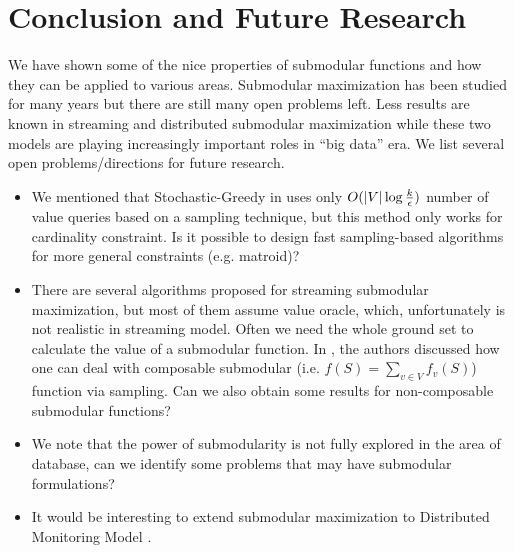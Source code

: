 \section{Conclusion and Future Research}
\label{sec:conclusion}
We have shown some of the nice properties of submodular functions and how they can be applied to various areas. Submodular maximization has been studied for many years but there are still many open problems left. Less results are known in streaming and distributed submodular maximization while these two models are playing increasingly important roles in ``big data'' era. We list several open problems/directions for future research.

\begin{itemize}
\item We mentioned that {\sc Stochastic-Greedy} in \cite{MBK+15} uses only $O(|V|\log\frac{k}{\epsilon})$ number of value queries based on a sampling technique, but this method only works for cardinality constraint. Is it possible to design fast sampling-based algorithms for more general constraints (e.g. matroid)?
\item There are several algorithms proposed for streaming submodular maximization, but most of them assume value oracle, which, unfortunately is not realistic in streaming model. Often we need the whole ground set to calculate the value of a submodular function. In \cite{BMK+14}, the authors discussed how one can deal with composable submodular (i.e. $f(S) = \sum_{v\in V}f_v(S)$) function via sampling. Can we also obtain some results for non-composable submodular functions?
\item We note that the power of submodularity is not fully explored in the area of database, can we identify some problems that may have submodular formulations? 
\item It would be interesting to extend submodular maximization to Distributed Monitoring Model \cite{CMY11}.
\end{itemize}
